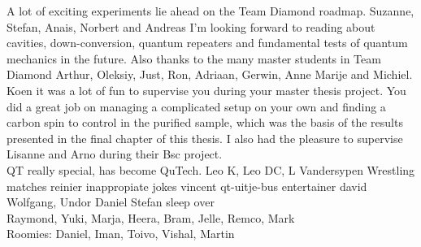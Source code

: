 \documentclass{report}
\begin{document}
A lot of exciting experiments lie ahead on the Team Diamond roadmap. Suzanne, Stefan, Anais, Norbert and Andreas I'm looking forward to reading about cavities, down-conversion, quantum repeaters and fundamental tests of quantum mechanics in the future. Also thanks to the many master students in Team Diamond Arthur, Oleksiy, Just, Ron, Adriaan, Gerwin, Anne Marije and Michiel. Koen it was a lot of fun to supervise you during your master thesis project. You did a great job on managing a complicated setup on your own and finding a carbon spin to control in the purified sample, which was the basis of the results presented in the final chapter of this thesis. I also had the pleasure to supervise Lisanne and Arno during their Bsc project. \\

QT really special, has become QuTech. Leo K, Leo DC, L Vandersypen
Wrestling matches reinier
inappropiate jokes vincent
qt-uitje-bus entertainer david
Wolfgang, Undor Daniel Stefan sleep over \\
\newpage
Raymond, Yuki, Marja, Heera, Bram, Jelle, Remco, Mark \\
Roomies: Daniel, Iman, Toivo, Vishal, Martin \\
\end{document}
